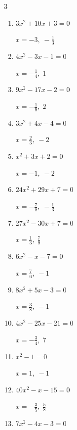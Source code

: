 \begin{multicols}{3}
\begin{enumerate}
        $\displaystyle x=\frac{2}{7},\; \frac{3}{2}$

  \item $3x^{2}+10x+3=0$

        $\displaystyle x=-3,\; -\frac{1}{3}$

  \item $4x^{2}-3x-1=0$

        $\displaystyle x=-\frac{1}{4},\; 1$

  \item $9x^{2}-17x-2=0$

        $\displaystyle x=-\frac{1}{9},\; 2$

  \item $3x^{2}+4x-4=0$

        $\displaystyle x=\frac{2}{3},\; -2$

  \item $x^{2}+3x+2=0$

        $\displaystyle x=-1,\; -2$

  \item $24x^{2}+29x+7=0$

        $\displaystyle x=-\frac{7}{8},\; -\frac{1}{3}$

  \item $27x^{2}-30x+7=0$

        $\displaystyle x=\frac{1}{3},\; \frac{7}{9}$

  \item $6x^{2}-x-7=0$

        $\displaystyle x=\frac{7}{6},\; -1$

  \item $8x^{2}+5x-3=0$

        $\displaystyle x=\frac{3}{8},\; -1$

\columnbreak %

\resetques

  \item $4x^{2}-25x-21=0$

        $\displaystyle x=-\frac{3}{4},\; 7$

  \item $x^{2}-1=0$

        $\displaystyle x=1,\; -1$

  \item $40x^{2}-x-15=0$

        $\displaystyle x=-\frac{3}{5},\; \frac{5}{8}$

  \item $7x^{2}-4x-3=0$


\end{enumerate}
\end{multicols}
